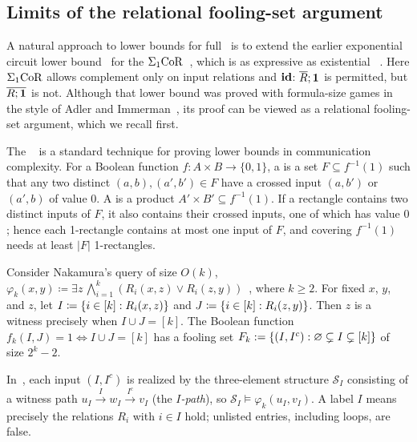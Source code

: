 \subsection{Limits of the relational fooling-set argument}\label{sec:natural-approaches}
A natural approach to lower bounds for full \CoR\ is to extend the earlier
exponential circuit lower bound~\citep[Theorems~6.1 and~6.12]{nakamura2022}
for the  $\Sigma_1\mathrm{CoR}$~\citep{nakamura2022,nakamura2023}, which is as expressive as existential \FOthree~\citep[Corollary~3.14]{nakamura2022}.
Here $\Sigma_1\mathrm{CoR}$ allows complement only on input relations and $\mathbf{id}$:
$\overline R;\mathbf{1}$ is permitted, but $\overline{R;\mathbf{1}}$ is not.
Although that lower bound was proved with formula-size games in the
style of Adler and Immerman~\citep{adler-immerman2003}, its proof can be
viewed as a relational fooling-set argument, which we recall first.

The ~\citep{yao1979,lipton-sedgewick1981,kushilevitz-nisan1997,rao-yehudayoff2020}
is a standard technique for proving lower bounds in communication complexity.
For a Boolean function $f\colon A\times B\to\{0,1\}$, a
 is a set $F\subseteq f^{-1}(1)$ such that any two
distinct $(a,b),(a',b')\in F$ have a crossed input $(a,b')$ or
$(a',b)$ of value $0$. A  is a product
$A'\times B'\subseteq f^{-1}(1)$. If a rectangle contains two distinct inputs of $F$,
it also contains their crossed inputs, one of which has value $0$; hence each
1\nobreakdash-rectangle contains at most one input of $F$, and covering
$f^{-1}(1)$ needs at least $|F|$ 1\nobreakdash-rectangles.

Consider Nakamura's query of size $O(k)$,
$\varphi_k(x,y)\coloneqq\exists z\,\bigwedge_{i=1}^k
(R_i(x,z)\lor R_i(z,y))$~\citep{nakamura2022}, where $k\ge2$.
%
For fixed $x$, $y$, and $z$,
let $I \coloneqq \{ i \in [k] : R_i(x,z) \}$ and
$J \coloneqq \{ i \in [k] : R_i(z,y) \}$.
Then $z$ is a witness precisely when $I \cup J = [k]$.
The Boolean function
$f_k(I,J)=1 \iff I\cup J=[k]$
has a fooling set
$F_k := \{ (I,I^c) : \varnothing \subsetneq I
\subsetneq [k] \}$
of size $2^k-2$.

In~\citep[\S5]{nakamura2022}, each input $(I,I^c)$ is realized by the
three-element structure $\mathcal S_I$ consisting of a witness path
$u_I\xrightarrow{\,I\,}w_I\xrightarrow{\,I^c\,}v_I$ (the \emph{$I$-path}), so $\mathcal S_I\models\varphi_k(u_I,v_I)$.
A label $I$ means precisely the relations $R_i$ with $i\in I$ hold; unlisted entries, including loops, are false.

